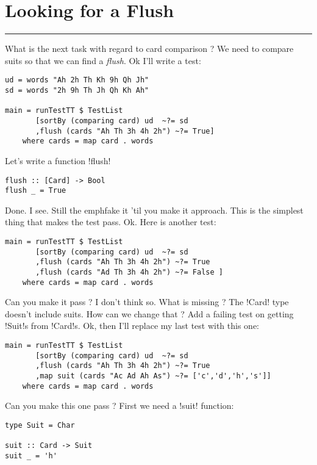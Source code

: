 \newpage
\section{Looking for a Flush} %
\vspace{10cm}
\hrule

\lhQ What is the next task with regard to card comparison ?
\lhA We need to compare suits so that we can find a \emph{flush}.
\lhN Ok I'll write a test:
\begin{lstlisting}[frame=single]
ud = words "Ah 2h Th Kh 9h Qh Jh"
sd = words "2h 9h Th Jh Qh Kh Ah"

main = runTestTT $ TestList 
       [sortBy (comparing card) ud  ~?= sd
       ,flush (cards "Ah Th 3h 4h 2h") ~?= True]
    where cards = map card . words
\end{lstlisting} %
\hspace*{\fill}
\lhA \error Let's write a function \il!flush!
\begin{lstlisting}[frame=single]
flush :: [Card] -> Bool
flush _ = True
\end{lstlisting}
\success Done.
\lhN I see. Still the emph{fake it 'til you make it} approach.
\lhA This is the simplest thing that makes the test pass.
\lhN Ok. Here is another test:
\begin{lstlisting}[frame=single]
main = runTestTT $ TestList 
       [sortBy (comparing card) ud  ~?= sd
       ,flush (cards "Ah Th 3h 4h 2h") ~?= True
       ,flush (cards "Ad Th 3h 4h 2h") ~?= False ]
    where cards = map card . words
\end{lstlisting} %
Can you make it pass ?
\lhA \failure I don't think so.
\lhN What is missing ?
\lhA The \il!Card! type doesn't include suits.
\lhN How can we change that ?
\lhA Add a failing test on getting \il!Suit!s from \il!Card!s.
\lhN Ok, then I'll replace my last test with this one:
\begin{lstlisting}[frame=single]
main = runTestTT $ TestList 
       [sortBy (comparing card) ud  ~?= sd
       ,flush (cards "Ah Th 3h 4h 2h") ~?= True
       ,map suit (cards "Ac Ad Ah As") ~?= ['c','d','h','s']]
    where cards = map card . words
\end{lstlisting} %
Can you make this one pass ?  
\lhA \error First we need a \il!suit! function:
\begin{lstlisting}[frame=single]
type Suit = Char

suit :: Card -> Suit
suit _ = 'h'
\end{lstlisting}
